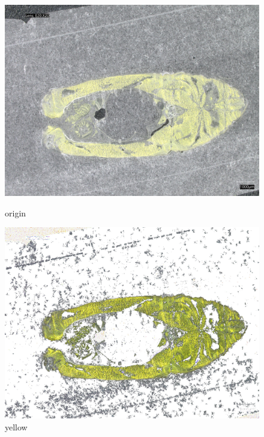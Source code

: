 \begin{figure}
    \centering
    \begin{minipage}{0.45\textwidth}
        \centering
        \includegraphics[width=\textwidth]{./fig/model2/origin20240205_161427.jpg}
        \caption{origin}
        \label{fig:origin}
    \end{minipage}
    \begin{minipage}{0.45\textwidth}
        \centering
        \includegraphics[width=\textwidth]{./fig/model2/yellow20240205_161427.jpg}
        \caption{yellow}
        \label{fig:yellow}
    \end{minipage}
\end{figure}

